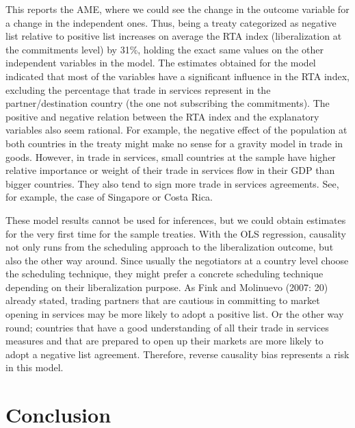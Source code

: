 \documentclass{article}
\begin{document}

This reports the AME, where we could see the change in the outcome variable for a change in the independent ones. Thus, being a treaty categorized as negative list relative to positive list increases on average the RTA index (liberalization at the commitments level) by 31\%, holding the exact same values on the other independent variables in the model. The estimates obtained for the model indicated that most of the variables have a significant influence in the RTA index, excluding the percentage that trade in services represent in the partner/destination country (the one not subscribing the commitments). The positive and negative relation between the RTA index and the explanatory variables also seem rational. For example, the negative effect of the population at both countries in the treaty might make no sense for a gravity model in trade in goods. However, in trade in services, small countries at the sample have higher relative importance or weight of their trade in services flow in their GDP than bigger countries. They also tend to sign more trade in services agreements. See, for example, the case of Singapore or Costa Rica.

\smallskip

These model results cannot be used for inferences, but we could obtain estimates for the very first time for the sample treaties. With the OLS regression, causality not only runs from the scheduling approach to the liberalization outcome, but also the other way around. Since usually the negotiators at a country level choose the scheduling technique, they might prefer a concrete scheduling technique depending on their liberalization purpose. As Fink and Molinuevo (2007: 20) already stated, trading partners that are cautious in committing to market opening in services may be more likely to adopt a positive list. Or the other way round; countries that have a good understanding of all their trade in services measures and that are prepared to open up their markets are more likely to adopt a negative list agreement. Therefore, reverse causality bias represents a risk in this model.

\section{Conclusion}
\end{document}
